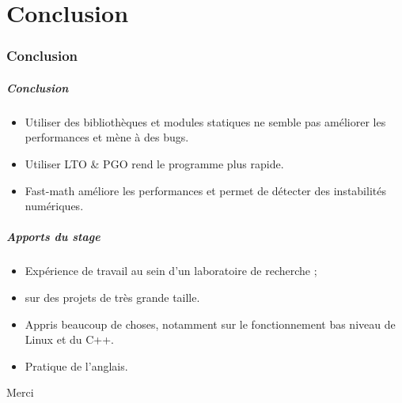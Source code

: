 \documentclass{beamer}
\begin{document}
\part{Conclusion}
\section*{Conclusion}

\begin{frame}[fragile]
    \frametitle{Conclusion}

    \begin{itemize}
        \item Utiliser des bibliothèques et modules statiques ne semble pas améliorer les performances et mène à des bugs.
        \item Utiliser LTO \& PGO rend le programme plus rapide.
        \item Fast-math améliore les performances et permet de détecter des instabilités numériques.
    \end{itemize}
\end{frame}

\begin{frame}[fragile]
    \frametitle{Apports du stage}

    \begin{itemize}
        \item Expérience de travail au sein d'un laboratoire de recherche ;
        \item sur des projets de très grande taille.
        \item Appris beaucoup de choses, notamment sur le fonctionnement bas niveau de Linux et du C++.
        \item Pratique de l'anglais.
    \end{itemize}
\end{frame}

\begin{frame}[fragile]
    \begin{Huge}
        \centerline{Merci}
    \end{Huge}
\end{frame}


\appendix
\end{document}
